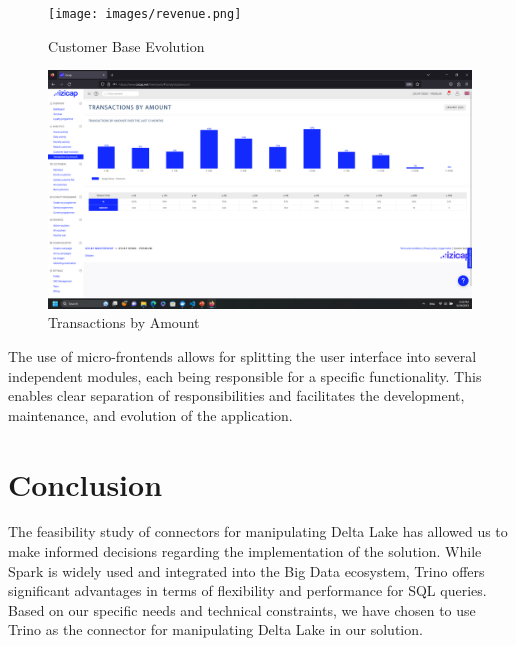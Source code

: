 \begin{figure}[H]
\centering
\texttt{[image: images/revenue.png]}
\caption{Customer Base Evolution}\label{fig:izicap-3}
\end{figure}

\begin{figure}[H]
\centering
\includegraphics[width=\linewidth]{images/data-2.png}
\caption{Transactions by Amount}\label{fig:izicap-4}
\end{figure}

The use of micro-frontends allows for splitting the user interface into several independent modules, each being responsible for a specific functionality. This enables clear separation of responsibilities and facilitates the development, maintenance, and evolution of the application.

\section*{Conclusion}
The feasibility study of connectors for manipulating Delta Lake has allowed us to make informed decisions regarding the implementation of the solution. While Spark is widely used and integrated into the Big Data ecosystem, Trino offers significant advantages in terms of flexibility and performance for SQL queries. Based on our specific needs and technical constraints, we have chosen to use Trino as the connector for manipulating Delta Lake in our solution.